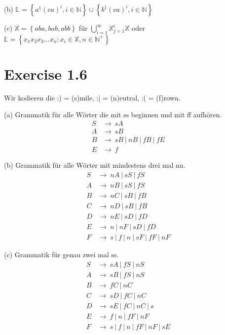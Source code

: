 \documentclass{article}
\begin{document}
\noindent (b) $\mathbb{L} = \left\{ a^1 (ca)^i, i \in \mathbb{N} \right\} \cup \left\{ b^1 (ca)^i, i \in \mathbb{N} \right\}$

\noindent (c) $\mathbb{X} = \left\{aba,bab,abb\right\}$ für $\bigcup\limits_{i=1}^{\infty} \mathbb{X}_{j=1}^i\mathbb{X}$ oder $\mathbb{L} = \left\{x_1x_2x_3...x_n: x_i \in \mathbb{X}, n \in \mathbb{N}^+\right\}$

\section*{Exercise 1.6}

Wir kodieren die  :) = (s)mile, :| = (n)eutral, :( = (f)rown.

\noindent (a) Grammatik f\"ur alle W\"orter die mit ss beginnen und mit ff aufh\"oren.
\begin{align*}
S &\rightarrow\ sA\\
A &\rightarrow\ sB\\
B &\rightarrow\ sB\ |\ nB\ |\ fB\ |\ fE\\
E &\rightarrow\ f\ %
\end{align*}

\noindent (b) Grammatik f\"ur alle W\"orter mit mindestens drei mal nn.
\begin{align*}
S &\rightarrow\ nA\ |\ sS\ |\ fS\\
A &\rightarrow\ nB\ |\ sS\ |\ fS\\
B &\rightarrow\ nC\ |\ sB\ |\ fB\\
C &\rightarrow\ nD\ |\ sB\ |\ fB\\
D &\rightarrow\ nE\ |\ sD\ |\ fD\\
E &\rightarrow\ n\ |\ nF\ |\ sD\ |\ fD\\
F &\rightarrow\ s\ |\ f\ |\ n\ |\ sF\ |\ fF\ |\ nF
\end{align*}

\noindent (c) Grammatik f\"ur genau zwei mal ss.
\begin{align*}
S &\rightarrow\ sA\ |\ fS\ |\ nS\\
A &\rightarrow\ sB\ |\ fS\ |\ nS\\
B &\rightarrow\ fC\ |\ nC\\
C &\rightarrow\ sD\ |\ fC\ |\ nC\\
D &\rightarrow\ sE\ |\ fC\ |\ nC\ |\ s\\
E &\rightarrow\ f\ |\ n\ |\ fF\ |\ nF\\
F &\rightarrow\ s\ |\ f\ |\ n\ |\ fF\ |\ nF\ |\ sE
\end{align*}
\end{document}
